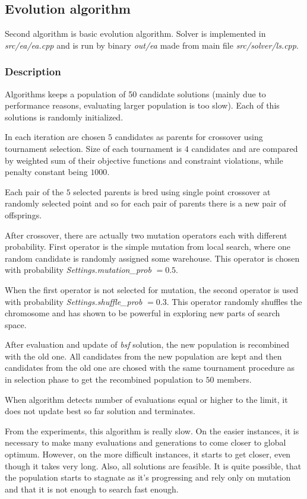 \documentclass[./main.tex]{subfiles}
\begin{document}
\subsection{Evolution algorithm}
Second algorithm is basic evolution algorithm.
Solver is implemented in \textit{src/ea/ea.cpp} and is run by binary \textit{out/ea} made from main file \textit{src/solver/ls.cpp}.

\subsubsection{Description}

Algorithms keeps a population of 50 candidate solutions (mainly due to performance reasons, evaluating larger population is too slow).
Each of this solutions is randomly initialized.

In each iteration are chosen $5$ candidates as parents for crossover using tournament selection.
Size of each tournament is $4$ candidates and are compared by weighted sum of their objective functions and constraint violations, while penalty constant being $1000$.

Each pair of the $5$ selected parents is bred using single point crossover at randomly selected point and so for each pair of parents there is a new pair of offsprings.

After crossover, there are actually two mutation operators each with different probability.
First operator is the simple mutation from local search, where one random candidate is randomly assigned some warehouse.
This operator is chosen with probability \textit{Settings.mutation\_prob} $ = 0.5$.

When the first operator is not selected for mutation, the second operator is used with probability \textit{Settings.shuffle\_prob} $ = 0.3$.
This operator randomly shuffles the chromosome and has shown to be powerful in exploring new parts of search space.

After evaluation and update of \textit{bsf} solution, the new population is recombined with the old one.
All candidates from the new population are kept and then candidates from the old one are chosed with the same tournament procedure as in selection phase to get the recombined population to $50$ members.

When algorithm detects number of evaluations equal or higher to the limit, it does not update best so far solution and terminates.

From the experiments, this algorithm is really slow.
On the easier instances, it is necessary to make many evaluations and generations to come closer to global optimum.
However, on the more difficult instances, it starts to get closer, even though it takes very long.
Also, all solutions are feasible.
It is quite possible, that the population starts to stagnate as it's progressing and rely only on mutation and that it is not enough to search fast enough.
\end{document}

